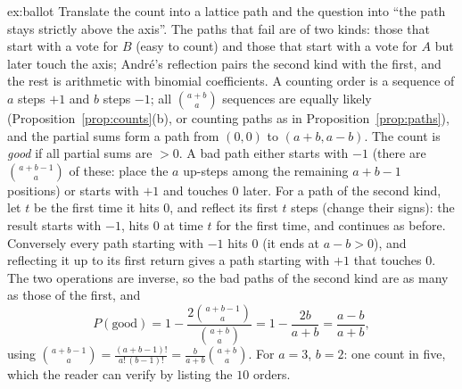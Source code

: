 \begin{solution}{ex:ballot}
\idea Translate the count into a lattice path and the question into ``the path stays strictly above the axis''. The paths that fail are of two kinds: those that start with a vote for $B$ (easy to count) and those that start with a vote for $A$ but later touch the axis; Andr\'e's reflection pairs the second kind with the first, and the rest is arithmetic with binomial coefficients.
\writeup A counting order is a sequence of $a$ steps $+1$ and $b$ steps $-1$; all $\binom{a+b}a$ sequences are equally likely (Proposition~\ref{prop:counts}(b), or counting paths as in Proposition~\ref{prop:paths}), and the partial sums form a path from $(0,0)$ to $(a+b,a-b)$. The count is \emph{good} if all partial sums are $>0$. A bad path either starts with $-1$ (there are $\binom{a+b-1}a$ of these: place the $a$ up-steps among the remaining $a+b-1$ positions) or starts with $+1$ and touches $0$ later. For a path of the second kind, let $t$ be the first time it hits $0$, and reflect its first $t$ steps (change their signs): the result starts with $-1$, hits $0$ at time $t$ for the first time, and continues as before. Conversely every path starting with $-1$ hits $0$ (it ends at $a-b>0$), and reflecting it up to its first return gives a path starting with $+1$ that touches $0$. The two operations are inverse, so the bad paths of the second kind are as many as those of the first, and
\[
P(\text{good})=1-\frac{2\binom{a+b-1}a}{\binom{a+b}a}=1-\frac{2b}{a+b}=\frac{a-b}{a+b},
\]
using $\binom{a+b-1}a=\frac{(a+b-1)!}{a!\,(b-1)!}=\frac b{a+b}\binom{a+b}a$. For $a=3$, $b=2$: one count in five, which the reader can verify by listing the $10$ orders.
\end{solution}

